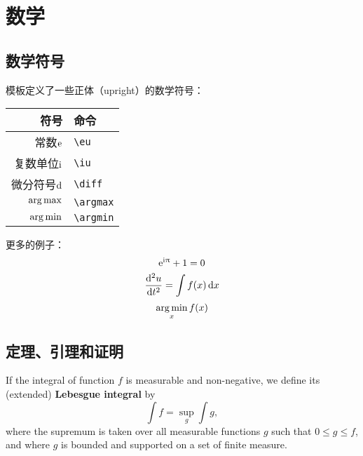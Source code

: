 \chapter{数学}

\section{数学符号}

模板定义了一些正体（upright）的数学符号：
\begin{center}
\begin{tabular}{rl}
  \toprule
    符号                 & 命令 \\
  \midrule
    常数$\mathrm{e}$     & \verb|\eu| \\
    复数单位$\mathrm{i}$ & \verb|\iu| \\
    微分符号$\mathop{}\!\mathrm{d}$ & \verb|\diff| \\
    $\operatorname*{arg\,max}$         & \verb|\argmax| \\
    $\operatorname*{arg\,min}$         & \verb|\argmin| \\
  \bottomrule
\end{tabular}
\end{center}

更多的例子：
\begin{equation}
  \mathrm{e}^{\mathrm{i}\uppi} + 1 = 0
\end{equation}
\begin{equation}
  \frac{\mathop{}\!\mathrm{d}^2u}{\mathop{}\!\mathrm{d} t^2} = \int f(x) \mathop{}\!\mathrm{d} x
\end{equation}
\begin{equation}
  \operatorname*{arg\,min}_x f(x)
\end{equation}

\section{定理、引理和证明}

\begin{definition}
    If the integral of function $f$ is measurable and non-negative, we define
    its (extended) \textbf{Lebesgue integral} by
    \begin{equation}
        \int f = \sup_g \int g,
    \end{equation}
    where the supremum is taken over all measurable functions $g$ such that
    $0 \leq g \leq f$, and where $g$ is bounded and supported on a set of
    finite measure.
\end{definition}

